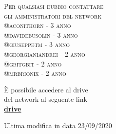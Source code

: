 \documentclass[a4paper, 11pt, oneside, article]{book} %
\begin{document}
\begin{titlepage}
	{  \scshape 
		Per qualsiasi dubbio contattare\\ 
		gli amministratori del network \break \\ 
		@aconithorn - 3\textordmasculine \hspace{0.01cm} anno\\
		@davidebusolin - 3\textordmasculine \hspace{0.01cm} anno\\
		@giuseppetm - 3\textordmasculine \hspace{0.01cm} anno\\ 
		@georgianiandrei - 2\textordmasculine \hspace{0.01cm} anno\\
		@gbitgbit - 2\textordmasculine \hspace{0.01cm} anno\\
		@mrbrionix - 2\textordmasculine \hspace{0.01cm} anno\\
		} %
	
	\vspace{3\baselineskip} %
	
	È possibile accedere al drive \\del network al seguente link\\
	\textbf{\href{https://drive.google.com/drive/folders/0BwzuyD3iLGcbcUNxTVNOVE9FR1E}{drive}}
	
	
	\vfill %
	
	
	{\large Ultima modifica in data 23/09/2020} 

\end{titlepage}



\textcolor{red}{}\\
\end{document}
